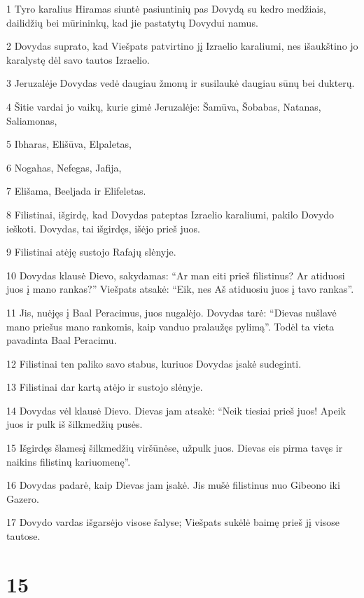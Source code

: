 \par 1 Tyro karalius Hiramas siuntė pasiuntinių pas Dovydą su kedro medžiais, dailidžių bei mūrininkų, kad jie pastatytų Dovydui namus. 
\par 2 Dovydas suprato, kad Viešpats patvirtino jį Izraelio karaliumi, nes išaukštino jo karalystę dėl savo tautos Izraelio. 
\par 3 Jeruzalėje Dovydas vedė daugiau žmonų ir susilaukė daugiau sūnų bei dukterų. 
\par 4 Šitie vardai jo vaikų, kurie gimė Jeruzalėje: Šamūva, Šobabas, Natanas, Saliamonas, 
\par 5 Ibharas, Elišūva, Elpaletas, 
\par 6 Nogahas, Nefegas, Jafija, 
\par 7 Elišama, Beeljada ir Elifeletas. 
\par 8 Filistinai, išgirdę, kad Dovydas pateptas Izraelio karaliumi, pakilo Dovydo ieškoti. Dovydas, tai išgirdęs, išėjo prieš juos. 
\par 9 Filistinai atėję sustojo Rafajų slėnyje. 
\par 10 Dovydas klausė Dievo, sakydamas: “Ar man eiti prieš filistinus? Ar atiduosi juos į mano rankas?” Viešpats atsakė: “Eik, nes Aš atiduosiu juos į tavo rankas”. 
\par 11 Jis, nuėjęs į Baal Peracimus, juos nugalėjo. Dovydas tarė: “Dievas nušlavė mano priešus mano rankomis, kaip vanduo pralaužęs pylimą”. Todėl ta vieta pavadinta Baal Peracimu. 
\par 12 Filistinai ten paliko savo stabus, kuriuos Dovydas įsakė sudeginti. 
\par 13 Filistinai dar kartą atėjo ir sustojo slėnyje. 
\par 14 Dovydas vėl klausė Dievo. Dievas jam atsakė: “Neik tiesiai prieš juos! Apeik juos ir pulk iš šilkmedžių pusės. 
\par 15 Išgirdęs šlamesį šilkmedžių viršūnėse, užpulk juos. Dievas eis pirma tavęs ir naikins filistinų kariuomenę”. 
\par 16 Dovydas padarė, kaip Dievas jam įsakė. Jis mušė filistinus nuo Gibeono iki Gazero. 
\par 17 Dovydo vardas išgarsėjo visose šalyse; Viešpats sukėlė baimę prieš jį visose tautose.



\chapter{15}


